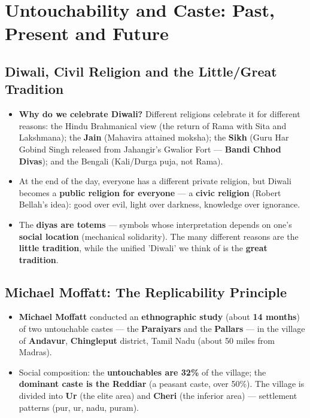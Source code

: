 \chapter{Untouchability and Caste: Past, Present and Future}

\section{Diwali, Civil Religion and the Little/Great Tradition}

\begin{ExampleBox}
\begin{itemize}
\item \textbf{Why do we celebrate Diwali?} Different religions celebrate it for different reasons: the Hindu Brahmanical view (the return of Rama with Sita and Lakshmana); the \textbf{Jain} (Mahavira attained moksha); the \textbf{Sikh} (Guru Har Gobind Singh released from Jahangir's Gwalior Fort --- \textbf{Bandi Chhod Divas}); and the Bengali (Kali/Durga puja, not Rama).
\item At the end of the day, everyone has a different private religion, but Diwali becomes a \textbf{public religion for everyone} --- a \textbf{civic religion} (Robert Bellah's idea): good over evil, light over darkness, knowledge over ignorance.
\item The \textbf{diyas are totems} --- symbols whose interpretation depends on one's \textbf{social location} (mechanical solidarity). The many different reasons are the \textbf{little tradition}, while the unified 'Diwali' we think of is the \textbf{great tradition}.
\end{itemize}
\end{ExampleBox}

\section{Michael Moffatt: The Replicability Principle}

\begin{ExampleBox}
\begin{itemize}
\item \textbf{Michael Moffatt} conducted an \textbf{ethnographic study} (about \textbf{14 months}) of two untouchable castes --- the \textbf{Paraiyars} and the \textbf{Pallars} --- in the village of \textbf{Andavur}, \textbf{Chingleput} district, Tamil Nadu (about 50 miles from Madras).
\item Social composition: the \textbf{untouchables are 32\%} of the village; the \textbf{dominant caste is the Reddiar} (a peasant caste, over 50\%). The village is divided into \textbf{Ur} (the elite area) and \textbf{Cheri} (the inferior area) --- settlement patterns (pur, ur, nadu, puram).
\end{itemize}
\end{ExampleBox}

